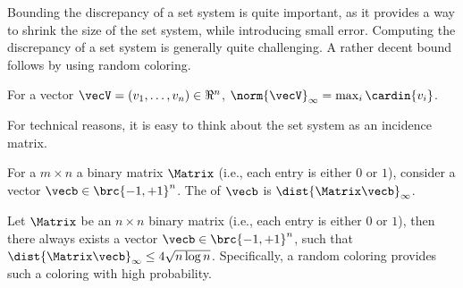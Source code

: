 Bounding the discrepancy of a set system is quite important, as it
provides a way to shrink the size of the set system, while introducing
small error. Computing the discrepancy of a set system is generally
quite challenging. A rather decent bound follows by using random
coloring. 

    
\begin{defn}
    For a vector $\vecV = (v_1,\ldots, v_n) \in \Re^n$,
    $\norm{\vecV}_\infty = \max_{i} \cardin{v_i}$.
\end{defn}

For technical reasons, it is easy to think about the set
system as an incidence matrix.

\begin{defn}       
    For a $m \times n$ a binary matrix $\Matrix$ (i.e., each entry is
    either $0$ or $1$), consider a vector $\vecb \in \brc{-1,
       +1}^n$. The  of $\vecb$ is
    $\dist{\Matrix \vecb}_\infty$.
\end{defn}


\begin{theorem}
    Let $\Matrix$ be an $n \times n$ binary matrix (i.e., each entry
    is either $0$ or $1$), then there always exists a vector
    $\vecb \in \brc{-1, +1}^n$, such that
    $\dist{\Matrix \vecb}_\infty \leq 4 \sqrt{n \log
       n}$. Specifically, a random coloring provides such a coloring
    with high probability.
\end{theorem}

